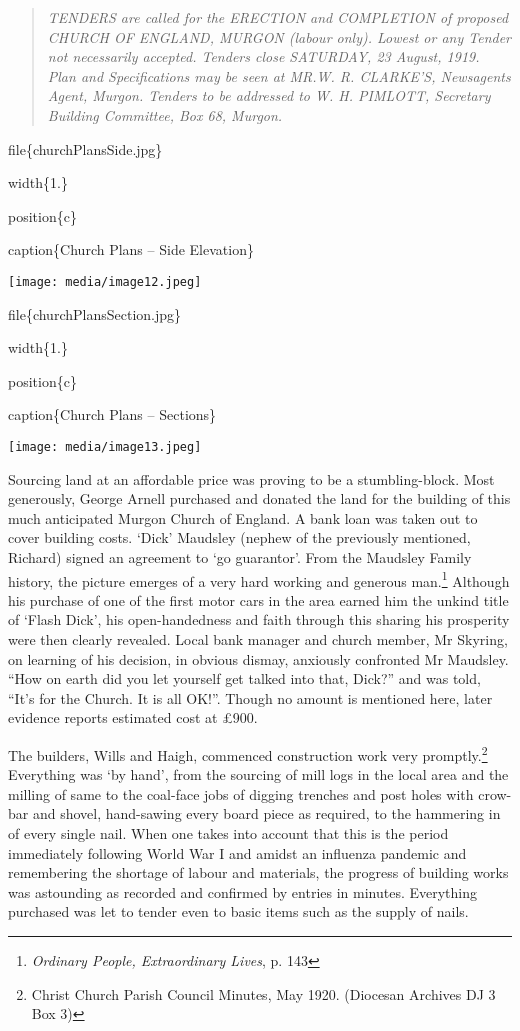 \begin{quote}
\emph{TENDERS are called for the ERECTION and COMPLETION of proposed CHURCH OF ENGLAND, MURGON (labour only). Lowest or any Tender not necessarily accepted. Tenders close SATURDAY, 23 August, 1919. Plan and Specifications may be seen at MR.W. R. CLARKE'S, Newsagents Agent, Murgon. Tenders to be addressed to W. H. PIMLOTT, Secretary Building Committee, Box 68, Murgon.}
\end{quote}

file\{churchPlansSide.jpg\}

width\{1.\}

position\{c\}

caption\{Church Plans -- Side Elevation\}

\texttt{[image: media/image12.jpeg]}

file\{churchPlansSection.jpg\}

width\{1.\}

position\{c\}

caption\{Church Plans -- Sections\}

\texttt{[image: media/image13.jpeg]}

Sourcing land at an affordable price was proving to be a stumbling-block. Most generously, George Arnell purchased and donated the land for the building of this much anticipated Murgon Church of England. A bank loan was taken out to cover building costs. `Dick' Maudsley (nephew of the previously mentioned, Richard) signed an agreement to `go guarantor'. From the Maudsley Family history, the picture emerges of a very hard working and generous man.\footnote{\emph{Ordinary People, Extraordinary Lives}, p. 143} Although his purchase of one of the first motor cars in the area earned him the unkind title of `Flash Dick', his open-handedness and faith through this sharing his prosperity were then clearly revealed. Local bank manager and church member, Mr Skyring, on learning of his decision, in obvious dismay, anxiously confronted Mr Maudsley. ``How on earth did you let yourself get talked into that, Dick?'' and was told, ``It's for the Church. It is all OK!''. Though no amount is mentioned here, later evidence reports estimated cost at £900.

The builders, Wills and Haigh, commenced construction work very promptly.\footnote{Christ Church Parish Council Minutes, May 1920. (Diocesan Archives DJ 3 Box 3)} Everything was `by hand', from the sourcing of mill logs in the local area and the milling of same to the coal-face jobs of digging trenches and post holes with crow-bar and shovel, hand-sawing every board piece as required, to the hammering in of every single nail. When one takes into account that this is the period immediately following World War I and amidst an influenza pandemic and remembering the shortage of labour and materials, the progress of building works was astounding as recorded and confirmed by entries in minutes. Everything purchased was let to tender even to basic items such as the supply of nails.


